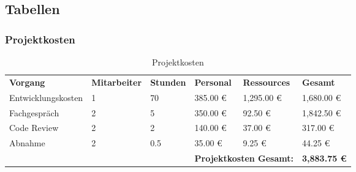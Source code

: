 \subsection{Tabellen}
\subsubsection{Projektkosten}
\begin{sidewaystable}
	\centering
	\caption{Projektkosten}
	\label{tabelle:projektkosten}
	\begin{tabular}{llllll}
		\rowcolor[HTML]{9698ED}
		{\color[HTML]{FFFFFF} \textbf{Vorgang}} & {\color[HTML]{FFFFFF} \textbf{Mitarbeiter}} & {\color[HTML]{FFFFFF} \textbf{Stunden}} & {\color[HTML]{FFFFFF} \textbf{Personal}} & {\color[HTML]{FFFFFF} \textbf{Ressources}} & {\color[HTML]{FFFFFF} \textbf{Gesamt}} \\
		Entwicklungskosten                      & 1                                           & 70                                      & 385.00 €                                 & 1,295.00 €                                 & 1,680.00 €                             \\
		\rowcolor[HTML]{BBDAFF}
		Fachgespräch                            & 2                                           & 5                                       & 350.00 €                                 & 92.50 €                                    & 1,842.50 €                             \\
		Code Review                             & 2                                           & 2                                       & 140.00 €                                 & 37.00 €                                    & 317.00 €                               \\
		\rowcolor[HTML]{BBDAFF}
		Abnahme                                 & 2                                           & 0.5                                     & 35.00 €                                  & 9.25 €                                     & 44.25 €                                \\
		&                                             &                                         & \multicolumn{2}{l}{\textbf{Projektkosten Gesamt:}}                                    & \textbf{3,883.75 €}
	\end{tabular}
\end{sidewaystable}

